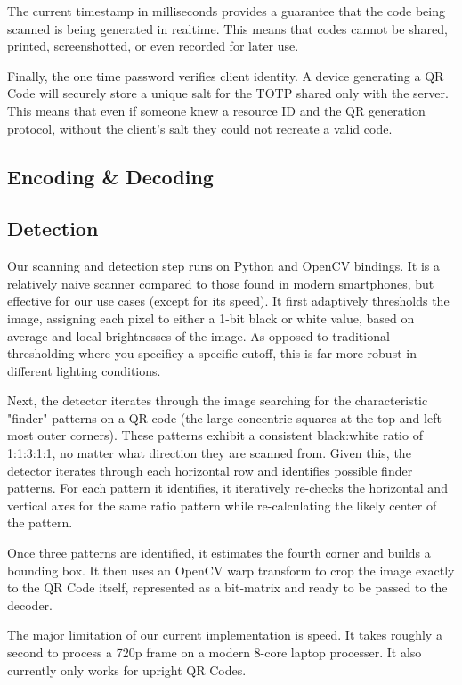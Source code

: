 \documentclass[10pt,twocolumn,letterpaper]{article}
\begin{document}
The current timestamp in milliseconds provides a guarantee that the code being scanned is being generated in realtime. This means that codes cannot be shared, printed, screenshotted, or even recorded for later use.

Finally, the one time password verifies client identity. A device generating a QR Code will securely store a unique salt for the TOTP shared only with the server. This means that even if someone knew a resource ID and the QR generation protocol, without the client's salt they could not recreate a valid code.

\subsection{Encoding \& Decoding}

\subsection{Detection}

Our scanning and detection step runs on Python and OpenCV bindings. It is a relatively naive scanner compared to those found in modern smartphones, but effective for our use cases (except for its speed). It first adaptively thresholds the image, assigning each pixel to either a 1-bit black or white value, based on average and local brightnesses of the image. As opposed to traditional thresholding where you specificy a specific cutoff, this is far more robust in different lighting conditions.

Next, the detector iterates through the image searching for the characteristic "finder" patterns on a QR code (the large concentric squares at the top and left-most outer corners). These patterns exhibit a consistent black:white ratio of 1:1:3:1:1, no matter what direction they are scanned from. Given this, the detector iterates through each horizontal row and identifies possible finder patterns. For each pattern it identifies, it iteratively re-checks the horizontal and vertical axes for the same ratio pattern while re-calculating the likely center of the pattern. 

Once three patterns are identified, it estimates the fourth corner and builds a bounding box. It then uses an OpenCV warp transform to crop the image exactly to the QR Code itself, represented as a bit-matrix and ready to be passed to the decoder.

The major limitation of our current implementation is speed. It takes roughly a second to process a 720p frame on a modern 8-core laptop processer. It also currently only works for upright QR Codes.
\end{document}
